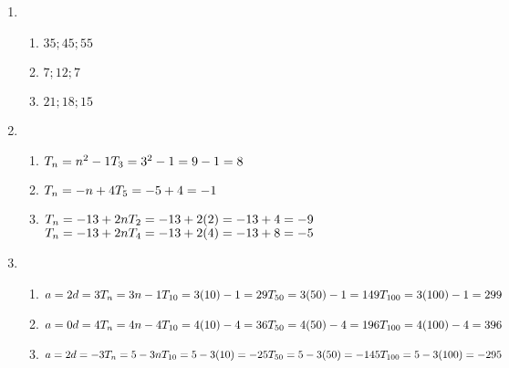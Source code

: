  \begin{solutions}{}{
\begin{enumerate}[noitemsep, label=\textbf{\arabic*}. ] 
\item 
  \begin{enumerate} [noitemsep, label=\textbf{(\alph*)} ]
  \item $35;45;55$
  \item $7;12;7$
  \item $21;18;15$
  \end{enumerate}
 \item 
  \begin{enumerate} [noitemsep, label=\textbf{(\alph*)} ]
  \item $T_n = n^{2}-1\\
T_3 = 3^2 - 1\\
= 9 -1\\
= 8$
  \item $T_n = -n + 4\\
T_5 = -5 + 4\\
= -1$
  \item $T_n = -13 + 2n\\
T_2 = -13 + 2(2)\\
= -13 + 4\\
= -9$ \\
$T_n = -13 + 2n\\
T_4 = -13 + 2(4)\\
= -13 + 8\\
= -5$
  \end{enumerate}
\item 
  \begin{enumerate}[noitemsep, label=\textbf{(\alph*)} ]
  \item $a = 2\\
d = 3\\
T_n = 3n - 1\\
T_{10} = 3(10) - 1 = 29\\
T_{50} = 3(50) - 1 = 149\\
T_{100} = 3(100) - 1 = 299$ 
  \item $a = 0\\
d = 4\\
T_n = 4n - 4\\
T_{10} = 4(10) - 4 = 36\\
T_{50} = 4(50) - 4 = 196\\
T_{100} = 4(100) - 4 = 396$ 
  \item $a = 2\\
d = -3\\
T_n = 5 - 3n\\
T_{10} = 5 - 3(10) = -25\\
T_{50} = 5 - 3(50) = -145\\
T_{100} = 5 - 3(100) = -295$ 
  \end{enumerate}
\end{enumerate}
}
\end{solutions}


